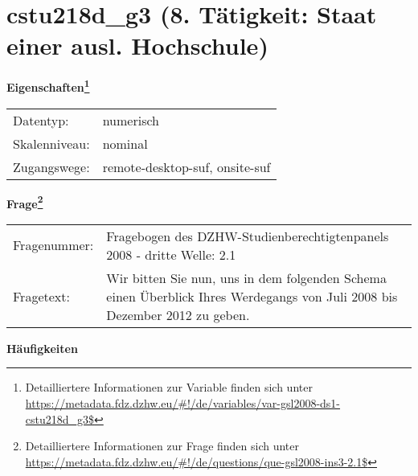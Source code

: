 
    \setcounter{footnote}{0}

    \vspace*{-1.8cm}
	\section{cstu218d\_g3 (8. Tätigkeit: Staat einer ausl. Hochschule)}
	\label{section:cstu218d_g3}



    \vspace*{0.5cm}
    \noindent\textbf{Eigenschaften\footnote{Detailliertere Informationen zur Variable finden sich unter
		\url{https://metadata.fdz.dzhw.eu/\#!/de/variables/var-gsl2008-ds1-cstu218d_g3$}}}\\
	\begin{tabularx}{\hsize}{@{}lX}
	Datentyp: & numerisch \\
	Skalenniveau: & nominal \\
	Zugangswege: &
	  remote-desktop-suf, 
	  onsite-suf
 \\
    \end{tabularx}



				\vspace*{0.5cm}
                \noindent\textbf{Frage\footnote{Detailliertere Informationen zur Frage finden sich unter
		              \url{https://metadata.fdz.dzhw.eu/\#!/de/questions/que-gsl2008-ins3-2.1$}}}\\
				\begin{tabularx}{\hsize}{@{}lX}
					Fragenummer: &
					  Fragebogen des DZHW-Studienberechtigtenpanels 2008 - dritte Welle:
					  2.1
 \\
					Fragetext: & Wir bitten Sie nun, uns in dem folgenden Schema einen Überblick Ihres Werdegangs von Juli 2008 bis Dezember 2012 zu geben. \\
				\end{tabularx}





        		\vspace*{0.5cm}
                \noindent\textbf{Häufigkeiten}


